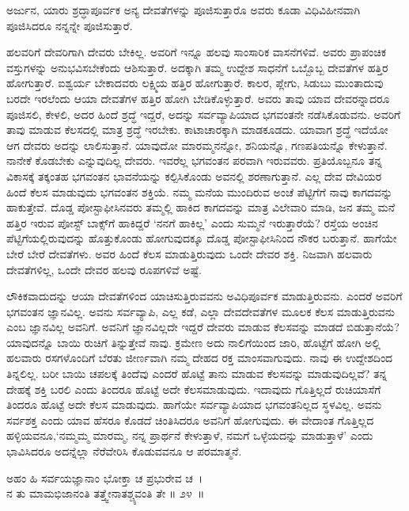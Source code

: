 \begin{artha}
ಅರ್ಜುನ, ಯಾರು ಶ್ರದ್ಧಾಪೂರ್ವಕ ಅನ್ಯ ದೇವತೆಗಳನ್ನು ಪೂಜಿಸುತ್ತಾರೊ ಅವರು ಕೂಡಾ ವಿಧಿವಿಹೀನವಾಗಿ ಪೂಜಿಸಿದರೂ ನನ್ನನ್ನೇ ಪೂಜಿಸುತ್ತಾರೆ.
\end{artha}

ಹಲವರಿಗೆ ದೇವರಿಗಾಗಿ ದೇವರು ಬೇಕಿಲ್ಲ. ಅವರಿಗೆ ಇನ್ನೂ ಹಲವು ಸಾಂಸಾರಿಕ ವಾಸನೆಗಳಿವೆ. ಅವರು ಪ್ರಾಪಂಚಿಕ ವಸ್ತುಗಳನ್ನು ಅನುಭವಿಸಬೇಕೆಂದು ಆಶಿಸುತ್ತಾರೆ. ಅದಕ್ಕಾಗಿ ತಮ್ಮ ಉದ್ದೇಶ ಸಾಧನೆಗೆ ಒಬ್ಬೊಬ್ಬ ದೇವತೆಗಳ ಹತ್ತಿರ ಹೋಗುತ್ತಾರೆ. ಐಶ್ವರ್ಯ ಬೇಕಾದವರು ಲಕ್ಷ್ಮಿಯ ಹತ್ತಿರ ಹೋಗುತ್ತಾರೆ. ಕಾಲರ, ಪ್ಲೇಗು, ಸಿಡುಬು ಮುಂತಾದುವು ಬರದೇ ಇರಲೆಂದು ಆಯಾ ದೇವತೆಗಳ ಹತ್ತಿರ ಹೋಗಿ ಬೇಡಿಕೊಳ್ಳುತ್ತಾರೆ. ಅವರು ತಾವು ಯಾವ ದೇವರನ್ನಾದರೂ ಪೂಜಿಸಲಿ, ಕೇಳಲಿ, ಅದರ ಹಿಂದೆ ಶ್ರದ್ಧೆ ಇದ್ದರೆ, ಅದನ್ನು ಸರ್ವವ್ಯಾಪಿಯಾದ ಭಗವಂತನೇ ನಡೆಸಿಕೊಡುವನು. ಅವರಿಗೆ ತಾವು ಮಾಡುವ ಕೆಲಸದಲ್ಲಿ ಮಾತ್ರ ಶ್ರದ್ಧೆ ಇರಬೇಕು. ಕಾಟಾಚಾರಕ್ಕಾಗಿ ಮಾಡಕೂಡದು. ಯಾವಾಗ ಶ್ರದ್ಧೆ ಇದೆಯೋ ಆಗ ದೇವರು ಅದನ್ನು ಲಾಲಿಸುತ್ತಾನೆ. ಯಾವುದೋ ಮಾರಮ್ಮನನ್ನೋ, ಶನಿಯನ್ನೊ, ಗಣಪತಿಯನ್ನೊ ಕೇಳುತ್ತಾನೆ. ನಾನೇಕೆ ಕೊಡಬೇಕು ಎನ್ನುವುದಿಲ್ಲ ದೇವರು. ಇವರೆಲ್ಲ ಭಗವಂತನ ಪರವಾಗಿ ಇರುವವರು. ಪ್ರತಿಯೊಬ್ಬನೂ ತನ್ನ ವಿಕಾಸಕ್ಕೆ ತಕ್ಕಂತಹ ಭಗವಂತನ ಭಾವನೆಯನ್ನು ಕಲ್ಪಿಸಿಕೊಂಡು ಅವನಲ್ಲಿ ಶರಣಾಗುತ್ತಾನೆ. ಎಲ್ಲ ದೇವ ದೇವಿಯರ ಹಿಂದೆ ಕೆಲಸ ಮಾಡುವುದು ಭಗವಂತನ ಶಕ್ತಿಯೆ. ನಮ್ಮ ಮನೆಯ ಮುಂದಿರುವ ಅಂಚೆ ಪೆಟ್ಟಿಗೆಗೆ ನಾವು ಕಾಗದವನ್ನು ಹಾಕುತ್ತೇವೆ. ದೊಡ್ಡ ಪೋಸ್ಟಾಫೀಸಿನವರು ತಮ್ಮಲ್ಲಿ ಹಾಕಿದ ಕಾಗದವನ್ನು ಮಾತ್ರ ವಿಲೇವಾರಿ ಮಾಡಿ, ಜನ ತಮ್ಮ ಮನೆ ಹತ್ತಿರ ಇರುವ ಪೋಸ್ಟ್ ಬಾಕ್ಸ್​ಗೆ ಹಾಕಿದ್ದರೆ ‘ನನಗೆ ಹಾಕಿಲ್ಲ’ ಎಂದು ಸುಮ್ಮನೆ ಇರುತ್ತಾರೆಯೆ? ರಸ್ತೆಯ ಅಂಚಿನ ಪೆಟ್ಟಿಗೆಯಲ್ಲಿರುವುದನ್ನು ಹೊತ್ತುಕೊಂಡು ಹೋಗುವುದಕ್ಕೂ ದೊಡ್ಡ ಪೋಸ್ಟಾಫೀಸಿನಿಂದ ನೌಕರ ಬರುತ್ತಾನೆ. ಹಾಗೆಯೇ ಬೇರೆ ಬೇರೆ ದೇವತೆಗಳು. ಅವರ ಹಿಂದೆ ಕೆಲಸ ಮಾಡುತ್ತಿರುವುದು ಒಂದೇ ದೇವರ ಶಕ್ತಿ. ನಿಜವಾಗಿ ಹಲವಾರು ದೇವತೆಗಳಿಲ್ಲ, ಒಂದೇ ದೇವರ ಹಲವು ರೂಪಗಳಿವೆ ಅಷ್ಟೆ.

ಲೌಕಿಕವಾದುದನ್ನು ಆಯಾ ದೇವತೆಗಳಿಂದ ಯಾಚಿಸುತ್ತಿರುವವನು ಅವಿಧಿಪೂರ್ವಕ ಮಾಡು\-ತ್ತಿರುವನು. ಎಂದರೆ ಅವರಿಗೆ ಭಗವಂತನ ಜ್ಞಾನವಿಲ್ಲ. ಅವನು ಸರ್ವವ್ಯಾಪಿ, ಎಲ್ಲ ಕಡೆ, ಎಲ್ಲಾ ದೇವದೇವತೆಗಳ ಮೂಲಕ ಕೆಲಸ ಮಾಡುತ್ತಿರುವನು ಎಂಬ ಜ್ಞಾನವಿಲ್ಲ ಅವನಿಗೆ. ಅವನಿಗೆ ಜ್ಞಾನವಿಲ್ಲದೇ ಇದ್ದರೆ ದೇವರು ಮಾಡುವ ಕೆಲಸವನ್ನು ಮಾಡದೆ ಬಿಡುತ್ತಾನೆಯೆ? ಯಾವುದನ್ನೊ ಬಾಯಿ ರುಚಿಗೆ ತಿನ್ನುತ್ತೇವೆ ನಾವು. ಕ್ರಮೇಣ ಅದು ನಾಲಿಗೆಯಿಂದ ಜಾರಿ, ಹೊಟ್ಟೆಗೆ ಹೋಗಿ ಅಲ್ಲಿ ಹಲವಾರು ರಸಗಳೊಂದಿಗೆ ಬೆರತು ಜೀರ್ಣವಾಗಿ ನಮ್ಮ ದೇಹದ ರಕ್ತ ಮಾಂಸವಾಗುವುದು. ನಾವು ಈ ಉದ್ದೇಶದಿಂದ ತಿನ್ನಲಿಲ್ಲ. ಬರೀ ಬಾಯಿ ಚಪಲಕ್ಕೆ ತಿಂದೆವು ಎಂದರೆ ಹೊಟ್ಟೆ ತಾನು ಮಾಡುವ ಕೆಲಸವನ್ನು ಮಾಡುವುದಿಲ್ಲವೆ? ತನ್ನ ದೇಹಕ್ಕೆ ಶಕ್ತಿ ಬರಲಿ ಎಂದು ತಿಂದರೂ ಹೊಟ್ಟೆ ಅದೇ ಕೆಲಸಮಾಡುವುದು. ಇದಾವುದು ಗೊತ್ತಿಲ್ಲದೆ ರುಚಿಯಾಸೆಗೆ ತಿಂದರೂ ಹೊಟ್ಟೆ ಅದೇ ಕೆಲಸ ಮಾಡುವುದು. ಹಾಗೆಯೇ ಸರ್ವವ್ಯಾಪಿಯಾದ ಭಗವಂತನಿಲ್ಲದ ಸ್ಥಳವಿಲ್ಲ. ಅವನು ಸರ್ವಶಕ್ತ ಎಂದು ಯಾವ ಹೆಸರೂ ಕೊಡದೆ ಚಿಂತಿಸಿದರೂ ಅವನಿಗೆ ಹೋಗುವುದು. ಈ ವೇದಾಂತ ಗೊತ್ತಿಲ್ಲದ ಹಳ್ಳಿಯವನೂ,‘ನಮ್ಮಮ್ಮ ಮಾರಮ್ಮ, ನನ್ನ ಪ್ರಾರ್ಥನೆ ಕೇಳುತ್ತಾಳೆ, ನಮಗೆ ಒಳ್ಳೆಯದನ್ನು ಮಾಡುತ್ತಾಳೆ’ ಎಂದು ಭಾವಿಸಿದರೂ ಅದನ್ನೆಲ್ಲಾ ನೆರೆವೇರಿಸಿ ಕೊಡುವವನೂ ಆ ಪರಮಾತ್ಮನೆ.

\begin{shloka}
ಅಹಂ ಹಿ ಸರ್ವಯಜ್ಞಾನಾಂ ಭೋಕ್ತಾ ಚ ಪ್ರಭುರೇವ ಚ~।\\ನ ತು ಮಾಮಭಿಜಾನಂತಿ ತತ್ತ್ವೇನಾತಶ್ಚ್ಯವಂತಿ ತೇ \hfill॥ ೨೪~॥
\end{shloka}

